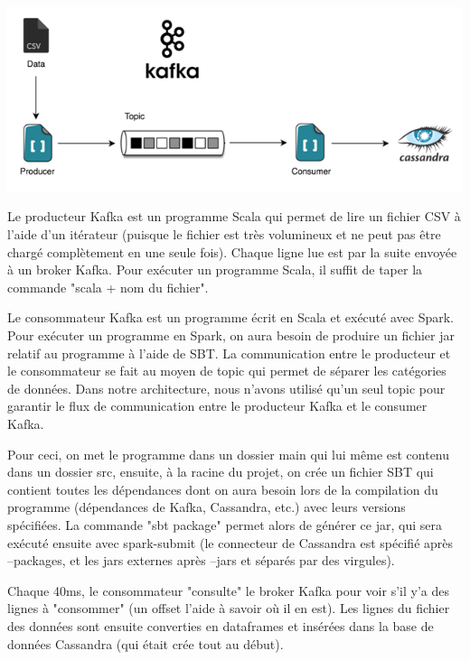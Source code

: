 \documentclass[a4paper, 11pt, titlepage]{article}
\begin{document}
\begin{center}
    \includegraphics[scale=0.55]{res/demo1.png}
\end{center}

Le producteur Kafka est un programme Scala qui permet de lire un fichier CSV à l'aide d'un itérateur (puisque le fichier est très volumineux et ne peut pas être chargé complètement en une seule fois). Chaque ligne lue est par la suite envoyée à un broker Kafka. Pour exécuter un programme Scala, il suffit de taper la commande "scala + nom du fichier".

Le consommateur Kafka est un programme écrit en Scala et exécuté avec Spark. Pour exécuter un programme en Spark, on aura besoin de produire un fichier jar relatif au programme à l'aide de SBT.  La communication entre le producteur et le consommateur se fait au moyen de topic qui permet de séparer les catégories de données. Dans notre architecture, nous n'avons utilisé qu'un seul topic pour garantir le flux de communication entre le producteur Kafka et le consumer Kafka.

Pour ceci, on met le programme dans un dossier main qui lui même est contenu dans un dossier src, ensuite, à la racine du projet, on crée un fichier SBT qui contient toutes les dépendances dont on aura besoin lors de la compilation du programme (dépendances de Kafka, Cassandra, etc.) avec leurs versions spécifiées. La commande "sbt package" permet alors de générer ce jar, qui sera exécuté ensuite avec spark-submit (le connecteur de Cassandra est spécifié après --packages, et les jars externes après --jars et séparés par des virgules).

Chaque 40ms, le consommateur "consulte" le broker Kafka pour voir s'il y'a des lignes à "consommer" (un offset l'aide à savoir où il en est). Les lignes du fichier des données sont ensuite converties en dataframes et insérées dans la base de données Cassandra (qui était crée tout au début).
 
\end{document}
